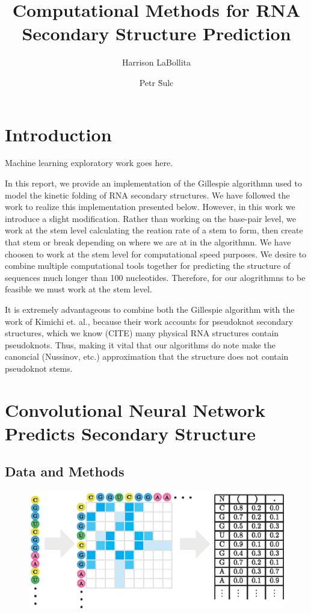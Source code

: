 \documentclass[11pt]{article}
\title{{\bf Computational Methods for RNA Secondary Structure Prediction}}
\author[1]{Harrison LaBollita}
\author[2]{Petr \u Sulc}
\date{}
\affil[1]{Department of Physics, Arizona State University, Tempe, AZ 85281 USA}
\affil[2]{Center for Biological Physics, Arizona State University, Tempe, AZ 85281 USA}
\begin{document}
\maketitle
\begin{abstract}
\lipsum[1]
\end{abstract}
\tableofcontents
\section{Introduction}
Machine learning exploratory work goes here.

In this report, we  provide an implementation of the Gillespie algorithmn used to model the kinetic folding of RNA secondary structures. We have followed the work \cite{10.1093/nar/gkv480, Kimchi338921} to realize this implementation presented below. However, in this work we introduce a slight modification. Rather than working on the base-pair level, we work at the stem level calculating the reation rate of a stem to form, then create that stem or break depending on where we are at in the algorithmn. We have choosen to work at the stem level for computational speed purposes. We desire to combine multiple computational tools together for predicting the structure of sequences much longer than 100 nucleotides. Therefore, for our alogrithmns to be feasible we must work at the stem level.

It is extremely advantageous to combine both the Gillespie algorithm with the work of Kimichi et. al., because their work accounts for pseudoknot secondary structures, which we know (CITE) many physical RNA structures contain pseudoknots. Thus, making it vital that our algorithms do note make the canoncial (Nussinov, etc.) approximation that the structure does not contain pseudoknot stems.
\section{Convolutional Neural Network Predicts Secondary Structure}
\subsection{Data and Methods}
\begin{figure}[H]
\centering
\hspace*{-8cm}\includegraphics{fig/cnn_model_outline}
\end{figure}
\lipsum[2]
\end{document}
